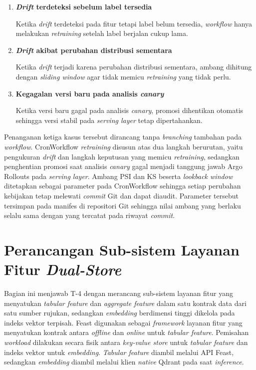 \vspace{0.5em}
\begin{enumerate}
    \item \textbf{\textit{Drift} terdeteksi sebelum label tersedia}

    Ketika \textit{drift} terdeteksi pada fitur tetapi label belum tersedia, \textit{workflow} hanya melakukan \textit{retraining} setelah label berjalan cukup lama.

    \vspace{0.5em}

    \item \textbf{\textit{Drift} akibat perubahan distribusi sementara}

    Ketika \textit{drift} terjadi karena perubahan distribusi sementara, ambang dihitung dengan \textit{sliding window} agar tidak memicu \textit{retraining} yang tidak perlu.

    \vspace{0.5em}

    \item \textbf{Kegagalan versi baru pada analisis \textit{canary}}

    Ketika versi baru gagal pada analisis \textit{canary}, promosi dihentikan otomatis sehingga versi stabil pada \textit{serving layer} tetap dipertahankan.
\end{enumerate}

Penanganan ketiga kasus tersebut dirancang tanpa \textit{branching} tambahan pada \textit{workflow}. CronWorkflow \textit{retraining} disusun atas dua langkah berurutan, yaitu pengukuran \textit{drift} dan langkah keputusan yang memicu \textit{retraining}, sedangkan penghentian promosi saat analisis \textit{canary} gagal menjadi tanggung jawab Argo Rollouts pada \textit{serving layer}. Ambang PSI dan KS beserta \textit{lookback window} ditetapkan sebagai parameter pada CronWorkflow sehingga setiap perubahan kebijakan tetap melewati \textit{commit} Git dan dapat diaudit. Parameter tersebut tersimpan pada manifes di repositori Git sehingga nilai ambang yang berlaku selalu sama dengan yang tercatat pada riwayat \textit{commit}.

\section{Perancangan Sub-sistem Layanan Fitur \textit{Dual-Store}}
\label{sec:feature-store-dual}

Bagian ini menjawab T-4 dengan merancang sub-sistem layanan fitur yang menyatukan \textit{tabular feature} dan \textit{aggregate feature} dalam satu kontrak data dari satu sumber rujukan, sedangkan \textit{embedding} berdimensi tinggi dikelola pada indeks vektor terpisah. Feast digunakan sebagai \textit{framework} layanan fitur yang menyatukan kontrak antara \textit{offline} dan \textit{online} untuk \textit{tabular feature}. Pemisahan \textit{workload} dilakukan secara fisik antara \textit{key-value store} untuk \textit{tabular feature} dan indeks vektor untuk \textit{embedding}. \textit{Tabular feature} diambil melalui API Feast, sedangkan \textit{embedding} diambil melalui klien \textit{native} Qdrant pada saat \textit{inference}.

